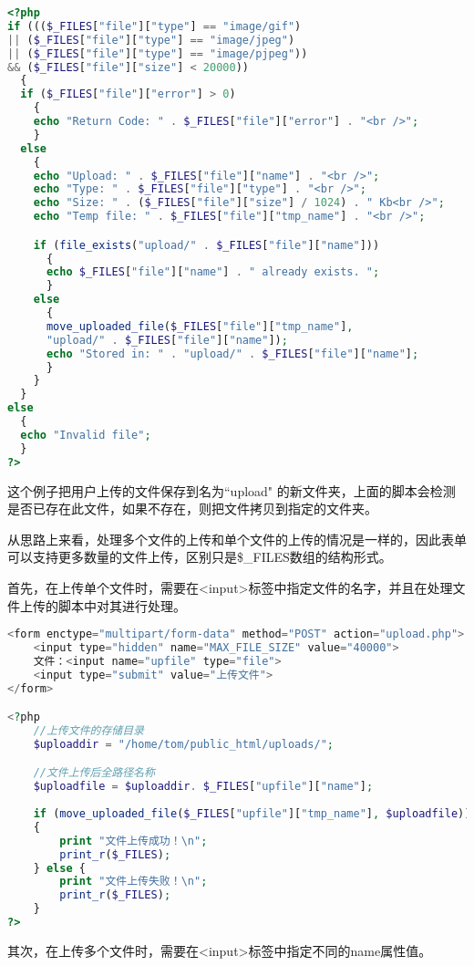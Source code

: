 \begin{lstlisting}[language=PHP]
<?php
if ((($_FILES["file"]["type"] == "image/gif")
|| ($_FILES["file"]["type"] == "image/jpeg")
|| ($_FILES["file"]["type"] == "image/pjpeg"))
&& ($_FILES["file"]["size"] < 20000))
  {
  if ($_FILES["file"]["error"] > 0)
    {
    echo "Return Code: " . $_FILES["file"]["error"] . "<br />";
    }
  else
    {
    echo "Upload: " . $_FILES["file"]["name"] . "<br />";
    echo "Type: " . $_FILES["file"]["type"] . "<br />";
    echo "Size: " . ($_FILES["file"]["size"] / 1024) . " Kb<br />";
    echo "Temp file: " . $_FILES["file"]["tmp_name"] . "<br />";

    if (file_exists("upload/" . $_FILES["file"]["name"]))
      {
      echo $_FILES["file"]["name"] . " already exists. ";
      }
    else
      {
      move_uploaded_file($_FILES["file"]["tmp_name"],
      "upload/" . $_FILES["file"]["name"]);
      echo "Stored in: " . "upload/" . $_FILES["file"]["name"];
      }
    }
  }
else
  {
  echo "Invalid file";
  }
?>
\end{lstlisting}

这个例子把用户上传的文件保存到名为``upload" 的新文件夹，上面的脚本会检测是否已存在此文件，如果不存在，则把文件拷贝到指定的文件夹。



从思路上来看，处理多个文件的上传和单个文件的上传的情况是一样的，因此表单可以支持更多数量的文件上传，区别只是\$\_FILES数组的结构形式。

首先，在上传单个文件时，需要在<input>标签中指定文件的名字，并且在处理文件上传的脚本中对其进行处理。


\begin{lstlisting}[language=PHP]
<form enctype="multipart/form-data" method="POST" action="upload.php">
	<input type="hidden" name="MAX_FILE_SIZE" value="40000">
	文件：<input name="upfile" type="file">
	<input type="submit" value="上传文件">
</form>

<?php
	//上传文件的存储目录
	$uploaddir = "/home/tom/public_html/uploads/";

	//文件上传后全路径名称
	$uploadfile = $uploaddir. $_FILES["upfile"]["name"];
	
	if (move_uploaded_file($_FILES["upfile"]["tmp_name"], $uploadfile)) 
	{
	    print "文件上传成功！\n";
	    print_r($_FILES);
	} else {
	    print "文件上传失败！\n";
	    print_r($_FILES);
	}
?>
\end{lstlisting}

其次，在上传多个文件时，需要在<input>标签中指定不同的name属性值。

